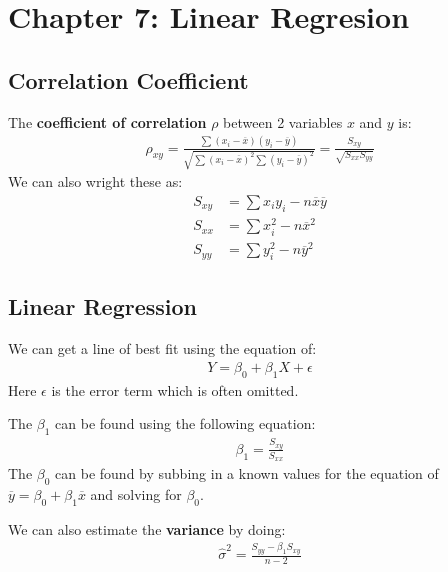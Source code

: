 \documentclass[12pt,letterpaper]{article} \usepackage{amsmath} \usepackage{graphicx} \usepackage[margin=1in]{geometry} \usepackage{longtable}  \usepackage{amssymb}
\begin{document}
	\section{Chapter 7: Linear Regresion}
	
	\subsection{Correlation Coefficient}
	The \textbf{coefficient of correlation} $\rho$ between 2 variables $x$ and $y$ is:
	\begin{align*}
		\rho_{xy} = \frac{\sum (x_i-\overline x)(y_i-\overline y)}{\sqrt{\sum (x_i - \overline x)^2 \sum(y_i - \overline y)^2}} = \frac{S_{xy}}{\sqrt{S_{xx}S_{yy}}}
	\end{align*}
	We can also wright these as:
	\begin{align*}
		S_{xy} &= \sum x_iy_i - n\overline x \overline y\\
		S_{xx} &= \sum x_i^2 - n\overline x ^2\\
		S_{yy} &= \sum y_i^2 - n\overline y ^2
	\end{align*}
	
	\subsection{Linear Regression}
	We can get a line of best fit using the equation of:
	\begin{align*}
		Y = \beta_0 + \beta_1 X+ \epsilon
	\end{align*}
	Here $\epsilon$ is the error term which is often omitted. 
	
	The $\beta_1$ can be found using the following equation:
	\begin{align*}
		\beta_1 = \frac{S_{xy}}{S_{xx}}
	\end{align*}
	The $\beta_0$ can be found by subbing in a known values for the equation of $\overline y = \beta_0 + \beta_1 \overline x$ and solving for $\beta_0$.
	
	We can also estimate the \textbf{variance} by doing:
	\begin{align*}
		\hat \sigma^2 = \frac{S_{yy} - \beta_1 S_{xy}}{n-2}
	\end{align*}
\end{document}
